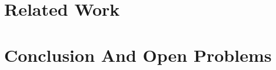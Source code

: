\documentclass[11pt]{article}
\begin{document}





\section{Related Work}
\label{sec:related-work}

\section{Conclusion And Open Problems}
\label{sec:conclusion}



\clearpage
\appendix
\end{document}
